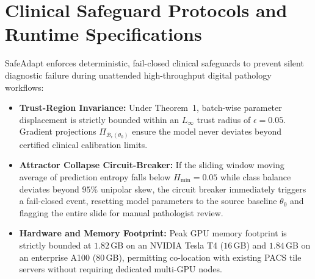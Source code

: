 \documentclass[journal]{IEEEtran}
\begin{document}
\begin{table}[t]
\centering
\caption{Synthetic Image Corruptions Benchmark (Severity Level 3).}
\label{tab:supp_corruptions}
\end{table}

\section{Clinical Safeguard Protocols and Runtime Specifications}
\label{sec:supp_safeguards}

SafeAdapt enforces deterministic, fail-closed clinical safeguards to prevent silent diagnostic failure during unattended high-throughput digital pathology workflows:
\begin{itemize}
\item \textbf{Trust-Region Invariance:} Under Theorem~1, batch-wise parameter displacement is strictly bounded within an $L_\infty$ trust radius of $\epsilon = 0.05$. Gradient projections $\Pi_{\mathcal{B}_\epsilon(\theta_0)}$ ensure the model never deviates beyond certified clinical calibration limits.
\item \textbf{Attractor Collapse Circuit-Breaker:} If the sliding window moving average of prediction entropy falls below $H_{\mathrm{min}} = 0.05$ while class balance deviates beyond $95\%$ unipolar skew, the circuit breaker immediately triggers a fail-closed event, resetting model parameters to the source baseline $\theta_0$ and flagging the entire slide for manual pathologist review.
\item \textbf{Hardware and Memory Footprint:} Peak GPU memory footprint is strictly bounded at $1.82$\,GB on an NVIDIA Tesla T4 ($16$\,GB) and $1.84$\,GB on an enterprise A100 ($80$\,GB), permitting co-location with existing PACS tile servers without requiring dedicated multi-GPU nodes.
\end{itemize}

\balance
\end{document}
